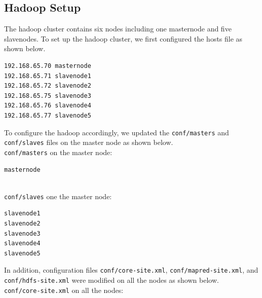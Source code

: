 \documentclass[conference]{IEEEtran}
\begin{document}
\subsection{Hadoop Setup}

The hadoop cluster contains six nodes including one masternode and five slavenodes. To set up the hadoop cluster, we first configured the hosts file as shown below.

\begin{verbatim}
192.168.65.70 masternode
192.168.65.71 slavenode1
192.168.65.72 slavenode2
192.168.65.75 slavenode3
192.168.65.76 slavenode4
192.168.65.77 slavenode5
\end{verbatim}

To configure the hadoop accordingly, we updated the \verb+conf/masters+ and \verb+conf/slaves+ files on the master node as shown below.\\[10pt]
\verb+conf/masters+ on the master node:
\begin{verbatim}
masternode
\end{verbatim}\\
\verb+conf/slaves+ one the master node:
\begin{verbatim}
slavenode1
slavenode2
slavenode3
slavenode4
slavenode5
\end{verbatim}

In addition, configuration files \verb+conf/core-site.xml+, \verb+conf/mapred-site.xml+, and \verb+conf/hdfs-site.xml+ were modified on all the nodes as shown below.\\[10pt]
\verb+conf/core-site.xml+ on all the nodes:
\end{document}
